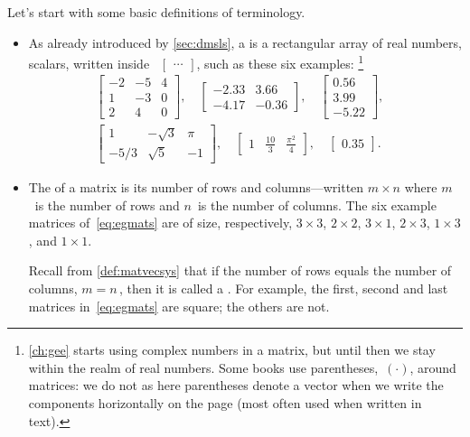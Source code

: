 Let's start with some basic definitions of terminology.
\begin{itemize}
\item As already introduced by \cref{sec:dmsls}, a  is a rectangular array of real numbers, scalars, written inside ~\(\begin{bmatrix} \cdots  \end{bmatrix}\), such as these six examples:
\footnote{\cref{ch:gee} starts using complex numbers in a matrix, but until then we stay within the realm of real numbers.  Some books use parentheses,~\((\cdot)\), around matrices: we do not as here parentheses denote a vector when we write the components horizontally on the page (most often used when written in text).}
\begin{align}&
\begin{bmatrix}   -2 & -5 & 4
\\ 1 & -3 & 0
\\ 2 & 4 & 0 \end{bmatrix},\quad
\begin{bmatrix}   -2.33 & 3.66
\\ -4.17 & -0.36 \end{bmatrix},\quad
\begin{bmatrix}  0.56
\\ 3.99 
\\-5.22 \end{bmatrix},\quad
\nonumber\\&
\begin{bmatrix}   1 & -\sqrt3 & \pi
\\ -5/3 & \sqrt5 & -1 \end{bmatrix},\quad
\begin{bmatrix}    1 & \frac{10}3 & \frac{\pi^2}4 \end{bmatrix},\quad
\begin{bmatrix} 0.35 \end{bmatrix}.
\qquad\label{eq:egmats}
\end{align}


\item The  of a matrix is its number of rows and columns---written \(m\times n\) where \(m\)~is the number of rows and \(n\)~is the number of columns.
The six example matrices of~\eqref{eq:egmats} are of size, respectively, \(3\times 3\), \(2\times 2\), \(3\times 1\), \(2\times 3\), \(1\times 3\), and \(1\times 1\).

Recall from \cref{def:matvecsys} that if the number of rows equals the number of columns, \(m=n\)\,, then it is called a .
For example, the first, second and last matrices in~\eqref{eq:egmats} are square; the others are not.


\end{itemize}
